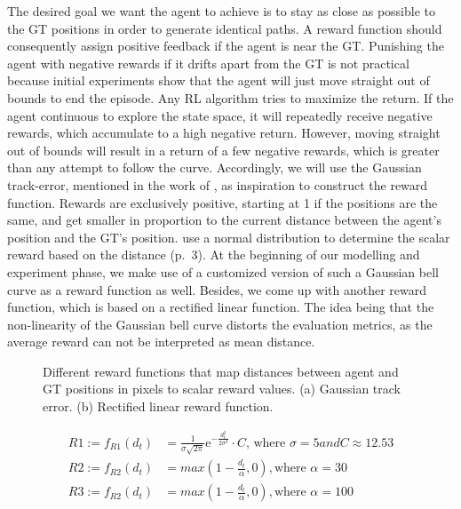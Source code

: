 The desired goal we want the agent to achieve is to stay as close as possible to the GT positions in order to generate identical paths. A reward function should consequently assign positive feedback if the agent is near the GT. Punishing the agent with negative rewards if it drifts apart from the GT is not practical because initial experiments show that the agent will just move straight out of bounds to end the episode. Any RL algorithm tries to maximize the return. If the agent continuous to explore the state space, it will repeatedly receive negative rewards, which accumulate to a high negative return. However, moving straight out of bounds will result in a return of a few negative rewards, which is greater than any attempt to follow the curve. Accordingly, we will use the Gaussian track-error, mentioned in the work of \cite{martinsen2018curved}, as inspiration to construct the reward function. Rewards are exclusively positive, starting at 1 if the positions are the same, and get smaller in proportion to the current distance between the agent's position and the GT's position. \cite{martinsen2018curved} use a normal distribution to determine the scalar reward based on the distance (p.~3). At the beginning of our modelling and experiment phase, we make use of a customized version of such a Gaussian bell curve as a reward function as well. Besides, we come up with another reward function, which is based on a rectified linear function. The idea being that the non-linearity of the Gaussian bell curve distorts the evaluation metrics, as the average reward can not be interpreted as mean distance. 

\begin{figure}[H]
    \centering
    \begin{subfigure}[b]{0.49\textwidth}
        \centering
        
        \caption{}
        \label{fig:reward1}
    \end{subfigure}
    \hfill
    \begin{subfigure}[b]{0.49\textwidth}
        \centering
        
        \caption{}
        \label{fig:reward2}
    \end{subfigure}
    \caption{Different reward functions that map distances between agent and GT positions in pixels to scalar reward values. (a) Gaussian track error. (b) Rectified linear reward function.}
    \label{fig:rewardFunctions}
\end{figure}


\begin{equation}
\begin{aligned}
    R1 := f_{R1}(d_t) &= \frac{1}{\sigma \sqrt{2\pi}} \mathrm{e}^{-\frac{d_t^2}{2\sigma^2}} \cdot C \text{, where $\sigma = 5 and C \approx 12.53$}
\\
R2 := f_{R2}(d_t) &= max(1 - \frac{d_t}{\alpha}, 0) , \text{where $\alpha = 30$}
\\
R3 := f_{R2}(d_t) &= max(1 - \frac{d_t}{\alpha}, 0) , \text{where $\alpha = 100$}
    \end{aligned}
\end{equation}\label{eq:rewardFunctions}
